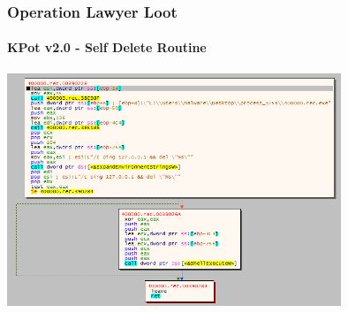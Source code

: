 \documentclass[aspectratio=169]{beamer}
\begin{document}
{
\begin{frame}
  \frametitle{Operation Lawyer Loot}
  \framesubtitle{KPot v2.0 - Self Delete Routine}
  \begin{center}
    \includegraphics[width=10cm]{kpot-ping-delete-1}
  \end{center}
\end{frame}
}
\end{document}
